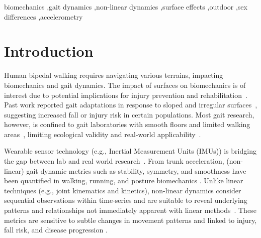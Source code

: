 \documentclass[authoryear,preprint,review,12pt]{elsarticle}
\begin{document}
\begin{frontmatter}
\begin{keyword}
biomechanics \sep gait dynamics \sep non-linear dynamics \sep surface effects \sep outdoor \sep sex differences \sep accelerometry


\end{keyword}

\end{frontmatter}

\section{Introduction}
\label{intro}
Human bipedal walking requires navigating various terrains, impacting biomechanics and gait dynamics. The impact of surfaces on biomechanics is of interest due to potential implications for injury prevention and rehabilitation~\citep{svenningsen_narrative_2020, schutte2016surface}. Past work reported gait adaptations in response to sloped and irregular surfaces~\citep{vieira_gait_2017, dixon_late-cueing_2018, schutte2016surface}, suggesting increased fall or injury risk in certain populations. Most gait research, however, is confined to gait laboratories with smooth floors and limited walking areas~\citep{svenningsen_narrative_2020, menz_acceleration_2003, dixon_aging_2018, dixon_late-cueing_2018, hunter_application_2023, maclellan_adaptations_2006, vieira_gait_2017, kent2019changes}, limiting ecological validity and real-world applicability~\citep{dillon2022impact}. 

Wearable sensor technology (e.g., Inertial Measurement Units (IMUs)) is bridging the gap between lab and real world research~\citep{luo_database_2020, ippersiel_impact_2022, schutte_influence_2018, hafer2023challenges}. From trunk acceleration, (non-linear) gait dynamic metrics such as stability, symmetry, and smoothness have been quantified in walking, running, and posture biomechanics \citep{svenningsen_narrative_2020, kiely_smoothness_2019, bruijn_estimating_2010, menz_acceleration_2003, moe2004estimation, emmerzaal_movement_2022, dixon_late-cueing_2018, schutte_influence_2018}. Unlike linear techniques (e.g., joint kinematics and kinetics), non-linear dynamics consider sequential observations within time-series and are suitable to reveal underlying patterns and relationships not immediately apparent with linear methods~\citep{stergiou_nonlinear_2016}. These metrics are sensitive to subtle changes in movement patterns and linked to injury, fall risk, and disease progression \citep{stergiou_human_2011, svenningsen_narrative_2020}.
\end{document}
